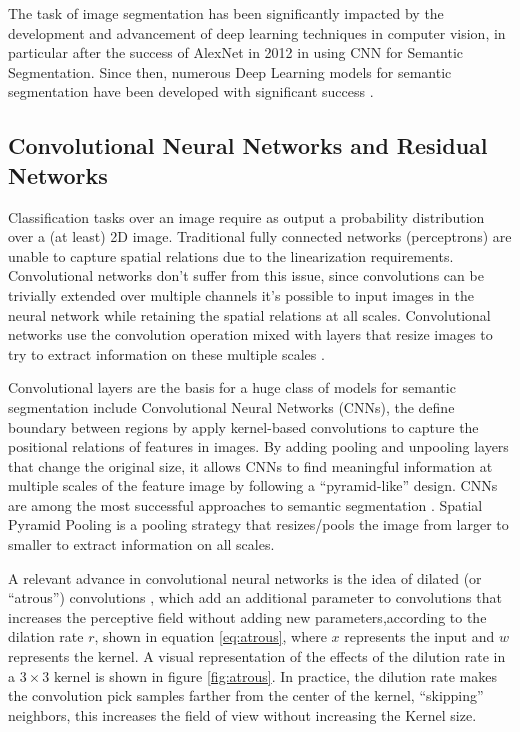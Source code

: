 \documentclass[10pt, conference]{IEEEtran}
\begin{document}
The task of image segmentation has been significantly impacted by the 
development and advancement of deep learning techniques in computer 
vision, in particular after the success of AlexNet in 2012 in using CNN 
for Semantic Segmentation. Since then, numerous Deep Learning models 
for semantic segmentation have been developed with significant 
success \cite{Sultana2020, Kale2021, Minaee2020}.

\subsection*{Convolutional Neural Networks and Residual Networks}

Classification tasks over an image require as output a probability distribution over a (at least)
2D image. Traditional fully connected networks (perceptrons) are unable to capture spatial
relations due to the linearization requirements. Convolutional networks don't suffer from this issue,
since convolutions can be trivially extended over multiple channels it's possible to input images
in the neural network while retaining the spatial relations at all scales. Convolutional networks
use the convolution operation mixed with layers that resize images to try to extract information
on these multiple scales \cite{Ghosh2019}.


Convolutional layers are the basis for a huge class of models for semantic segmentation include 
Convolutional Neural Networks (CNNs), the define boundary between regions by apply kernel-based 
convolutions to capture the positional relations of features in images. 
By adding pooling and unpooling layers that change the original size, 
it allows CNNs to find meaningful information at multiple scales of 
the feature image by following a ``pyramid-like'' design. CNNs are 
among the most successful approaches to semantic 
segmentation \cite{Minaee2020}. Spatial Pyramid Pooling is a pooling
strategy that resizes/pools the image from larger to smaller to
extract information on all scales.


A relevant advance in convolutional neural networks is the idea 
of dilated (or ``atrous'') convolutions \cite{Minaee2020, Chen2017}, 
which add an additional parameter to convolutions that increases the 
perceptive field without adding new parameters,according to the dilation rate $r$,
shown in equation \ref{eq:atrous}, where $x$ represents the input and
$w$ represents the kernel. A visual representation of the effects of the
dilution rate in a $3 \times 3$ kernel is shown in figure \ref{fig:atrous}.
In practice, the dilution rate makes the convolution pick samples farther from
the center of the kernel, ``skipping'' neighbors, this increases the field
of view without increasing the Kernel size.
\end{document}

